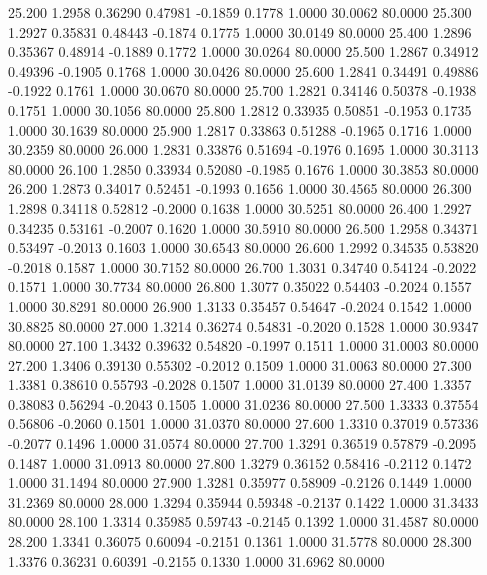   25.200   1.2958   0.36290   0.47981  -0.1859   0.1778   1.0000  30.0062  80.0000
  25.300   1.2927   0.35831   0.48443  -0.1874   0.1775   1.0000  30.0149  80.0000
  25.400   1.2896   0.35367   0.48914  -0.1889   0.1772   1.0000  30.0264  80.0000
  25.500   1.2867   0.34912   0.49396  -0.1905   0.1768   1.0000  30.0426  80.0000
  25.600   1.2841   0.34491   0.49886  -0.1922   0.1761   1.0000  30.0670  80.0000
  25.700   1.2821   0.34146   0.50378  -0.1938   0.1751   1.0000  30.1056  80.0000
  25.800   1.2812   0.33935   0.50851  -0.1953   0.1735   1.0000  30.1639  80.0000
  25.900   1.2817   0.33863   0.51288  -0.1965   0.1716   1.0000  30.2359  80.0000
  26.000   1.2831   0.33876   0.51694  -0.1976   0.1695   1.0000  30.3113  80.0000
  26.100   1.2850   0.33934   0.52080  -0.1985   0.1676   1.0000  30.3853  80.0000
  26.200   1.2873   0.34017   0.52451  -0.1993   0.1656   1.0000  30.4565  80.0000
  26.300   1.2898   0.34118   0.52812  -0.2000   0.1638   1.0000  30.5251  80.0000
  26.400   1.2927   0.34235   0.53161  -0.2007   0.1620   1.0000  30.5910  80.0000
  26.500   1.2958   0.34371   0.53497  -0.2013   0.1603   1.0000  30.6543  80.0000
  26.600   1.2992   0.34535   0.53820  -0.2018   0.1587   1.0000  30.7152  80.0000
  26.700   1.3031   0.34740   0.54124  -0.2022   0.1571   1.0000  30.7734  80.0000
  26.800   1.3077   0.35022   0.54403  -0.2024   0.1557   1.0000  30.8291  80.0000
  26.900   1.3133   0.35457   0.54647  -0.2024   0.1542   1.0000  30.8825  80.0000
  27.000   1.3214   0.36274   0.54831  -0.2020   0.1528   1.0000  30.9347  80.0000
  27.100   1.3432   0.39632   0.54820  -0.1997   0.1511   1.0000  31.0003  80.0000
  27.200   1.3406   0.39130   0.55302  -0.2012   0.1509   1.0000  31.0063  80.0000
  27.300   1.3381   0.38610   0.55793  -0.2028   0.1507   1.0000  31.0139  80.0000
  27.400   1.3357   0.38083   0.56294  -0.2043   0.1505   1.0000  31.0236  80.0000
  27.500   1.3333   0.37554   0.56806  -0.2060   0.1501   1.0000  31.0370  80.0000
  27.600   1.3310   0.37019   0.57336  -0.2077   0.1496   1.0000  31.0574  80.0000
  27.700   1.3291   0.36519   0.57879  -0.2095   0.1487   1.0000  31.0913  80.0000
  27.800   1.3279   0.36152   0.58416  -0.2112   0.1472   1.0000  31.1494  80.0000
  27.900   1.3281   0.35977   0.58909  -0.2126   0.1449   1.0000  31.2369  80.0000
  28.000   1.3294   0.35944   0.59348  -0.2137   0.1422   1.0000  31.3433  80.0000
  28.100   1.3314   0.35985   0.59743  -0.2145   0.1392   1.0000  31.4587  80.0000
  28.200   1.3341   0.36075   0.60094  -0.2151   0.1361   1.0000  31.5778  80.0000
  28.300   1.3376   0.36231   0.60391  -0.2155   0.1330   1.0000  31.6962  80.0000
